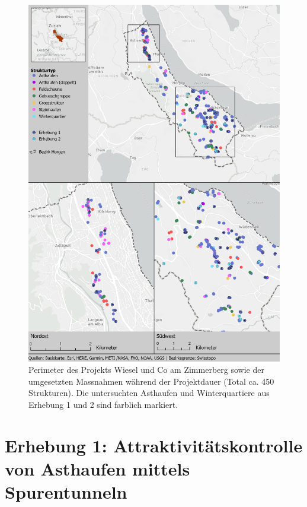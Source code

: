\documentclass[
  oneside]{scrbook}
\begin{document}
\begin{figure}
\includegraphics[width=1\linewidth]{images/Layout_Strukturen} \caption{Perimeter des Projekts Wiesel und Co am Zimmerberg sowie der umgesetzten Massnahmen während der Projektdauer (Total ca. 450 Strukturen). Die untersuchten Asthaufen und Winterquartiere aus Erhebung 1 und 2 sind farblich markiert.}\label{fig:layoutstrukturen}
\end{figure}

\hypertarget{erhebung-1-attraktivituxe4tskontrolle-von-asthaufen-mittels-spurentunneln}{%
\section{Erhebung 1: Attraktivitätskontrolle von Asthaufen mittels Spurentunneln}\label{erhebung-1-attraktivituxe4tskontrolle-von-asthaufen-mittels-spurentunneln}}
\end{document}
